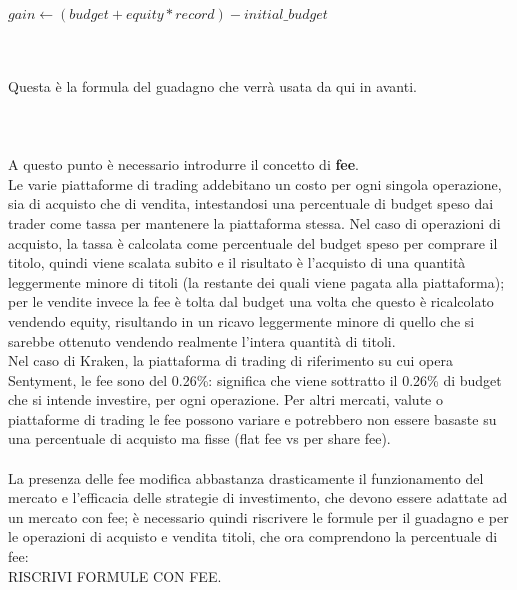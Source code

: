 \documentclass{article}
\begin{document}
	   \begin{algorithmic}
			\State $gain\gets (budget + equity * record) - initial\_budget$
		\end{algorithmic}

		\\~\\
		Questa è la formula del guadagno che verrà usata da qui in avanti.		
		\\~\\\\~\\
		A questo punto è necessario introdurre il concetto di \textbf{fee}.\\
		Le varie piattaforme di trading addebitano un costo per ogni singola operazione, sia di acquisto che di vendita, intestandosi una percentuale di budget speso dai trader come tassa per mantenere la piattaforma stessa. Nel caso di operazioni di acquisto, la tassa è calcolata come percentuale del budget speso per comprare il titolo, quindi viene scalata subito e il risultato è l'acquisto di una quantità leggermente minore di titoli (la restante dei quali viene pagata alla piattaforma); per le vendite invece la fee è tolta dal budget una volta che questo è ricalcolato vendendo equity, risultando in un ricavo leggermente minore di quello che si sarebbe ottenuto vendendo realmente l'intera quantità di titoli.\\
		Nel caso di Kraken, la piattaforma di trading di riferimento su cui opera Sentyment, le fee sono del 0.26\%: significa che viene sottratto il 0.26\% di budget che si intende investire, per ogni operazione. Per altri mercati, valute o piattaforme di trading le fee possono variare e potrebbero non essere basaste su una percentuale di acquisto ma fisse (flat fee vs per share fee).
		\\~\\
		La presenza delle fee modifica abbastanza drasticamente il funzionamento del mercato e l'efficacia delle strategie di investimento, che devono essere adattate ad un mercato con fee; è necessario quindi riscrivere le formule per il guadagno e per le operazioni di acquisto e vendita titoli, che ora comprendono la percentuale di fee:\\
		
		RISCRIVI FORMULE CON FEE.
		
		
		
		
		
		
		
\end{document}
